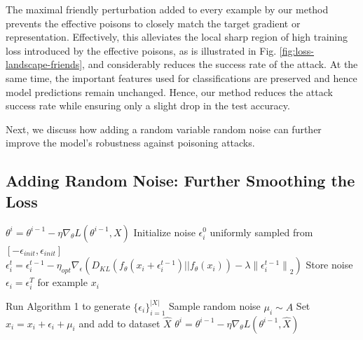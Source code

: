 \documentclass{article}
\newcommand{\alg}{\textsc{FrieNDs}}
\begin{document}
The maximal friendly perturbation added to every example by our method prevents the effective poisons to closely match the target gradient or representation.
Effectively, this alleviates the local sharp region of high training loss introduced by the effective poisons, as is illustrated in Fig. \ref{fig:loss-landscape-friends}, and 
considerably reduces the success rate of the attack.
At the same time, the important features used for classifications are preserved and hence model predictions remain unchanged.
Hence, our method reduces the attack success rate while %
ensuring only a slight drop in the test accuracy. %


Next, we discuss how adding a random variable random noise %
can further improve the model's robustness against poisoning attacks. %





\subsection{Adding Random Noise: Further Smoothing the Loss}

\begin{algorithm}[tb]
   \caption{Generating Friendly Noise}
   \label{alg:generate-noise}
\begin{algorithmic}
   \State  $\theta^i = \theta^{i-1} - \eta \nabla_{\theta} L(\theta^{i-1}, {X})$ 
   \EndFor
   \State Initialize noise $\epsilon_i^0$ uniformly sampled from $[-\epsilon_{init} , \epsilon_{init}]$
   \State $\epsilon_i^t = \epsilon_i^{t-1} - \eta_{opt} \nabla_\epsilon ({D_{KL}\left(f_\theta(x_i+\epsilon_i^{t-1}) || f_\theta(x_i)\right)} - \lambda {\|\epsilon_i^{t-1}\|}_2)$
   \EndFor
   \State Store noise $\epsilon_i = \epsilon_i^T$ for example $x_i$
   \EndFor
\end{algorithmic}
\end{algorithm}

\begin{algorithm}[tb]
  \caption{Training with \alg{}}
  \label{alg:training}
\begin{algorithmic}
  \State Run Algorithm 1 to generate $\{\epsilon_i\}_{i=1}^{|X|}$ %
  \State Sample random noise $\mu_i \sim A$
  \State Set $\hat{x}_i = x_i + \epsilon_i + \mu_i$ and add to dataset $\hat{X}$
  \EndFor
  \State $\theta^i = \theta^{i-1} - \eta \nabla_{\theta} L(\theta^{i-1}, \hat{X})$  
  \EndFor
\end{algorithmic}
\end{algorithm}
\end{document}
